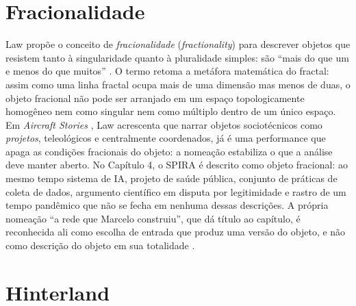 \begin{description}
\bigskip

\section*{Fracionalidade}

Law propõe o conceito de \textit{fracionalidade} (\textit{fractionality}) para descrever objetos que resistem tanto à singularidade quanto à pluralidade simples: são ``mais do que um e menos do que muitos'' \parencite[pp.~11--12]{LawHassard1999ANT}. O termo retoma a metáfora matemática do fractal: assim como uma linha fractal ocupa mais de uma dimensão mas menos de duas, o objeto fracional não pode ser arranjado em um espaço topologicamente homogêneo nem como singular nem como múltiplo dentro de um único espaço. Em \textit{Aircraft Stories} \parencite{Law2001Aircraft}, Law acrescenta que narrar objetos sociotécnicos como \textit{projetos}, teleológicos e centralmente coordenados, já é uma performance que apaga as condições fracionais do objeto: a nomeação estabiliza o que a análise deve manter aberto. No Capítulo 4, o SPIRA é descrito como objeto fracional: ao mesmo tempo sistema de IA, projeto de saúde pública, conjunto de práticas de coleta de dados, argumento científico em disputa por legitimidade e rastro de um tempo pandêmico que não se fecha em nenhuma dessas descrições. A própria nomeação ``a rede que Marcelo construiu'', que dá título ao capítulo, é reconhecida ali como escolha de entrada que produz uma versão do objeto, e não como descrição do objeto em sua totalidade \parencite{LawHassard1999ANT,Law2001Aircraft}.

\bigskip

\section*{Hinterland}


\end{description}
